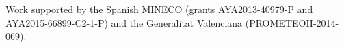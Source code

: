\documentclass{aa}
\begin{document}
%



\begin{acknowledgements}
      Work supported by the Spanish MINECO (grants AYA2013-40979-P and AYA2015-66899-C2-1-P) and the Generalitat Valenciana (PROMETEOII-2014-069).
\end{acknowledgements}

%
%



\end{document}

